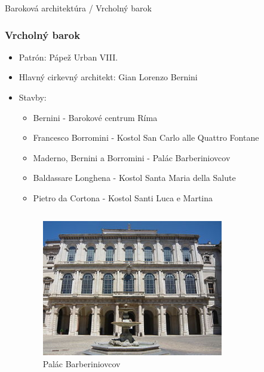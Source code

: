 \documentclass[dvipsnames]{beamer}
\begin{document}
\begin{frame}{\small \textcolor{g}{Baroková architektúra} / \Large Vrcholný barok}
	\subsubsection{Vrcholný barok}
	\begin{itemize}
		\item Patrón: Pápež \textcolor{BurntOrange}{Urban VIII.}
		\item Hlavný cirkevný architekt: \textcolor{BurntOrange}{Gian Lorenzo Bernini}
		\item Stavby:
		\begin{itemize}
			\item \textcolor{BurntOrange}{Bernini} - Barokové centrum Ríma
			\item \textcolor{BurntOrange}{Francesco Borromini} - Kostol San Carlo alle Quattro Fontane
			\item \textcolor{BurntOrange}{Maderno}, \textcolor{BurntOrange}{Bernini} a \textcolor{BurntOrange}{Borromini} - Palác Barberiniovcov
			\item \textcolor{BurntOrange}{Baldassare Longhena} - Kostol Santa Maria della Salute
			\item \textcolor{BurntOrange}{Pietro da Cortona} - Kostol Santi Luca e Martina
		\end{itemize}
		\begin{columns}
			\kern0pt
			\begin{figure}
				\includegraphics[scale=0.325]{barberini}
				\caption{Palác Barberiniovcov}
			\end{figure}%
			\begin{figure}

\end{figure}
\end{columns}
\end{itemize}
\end{frame}
\end{document}
